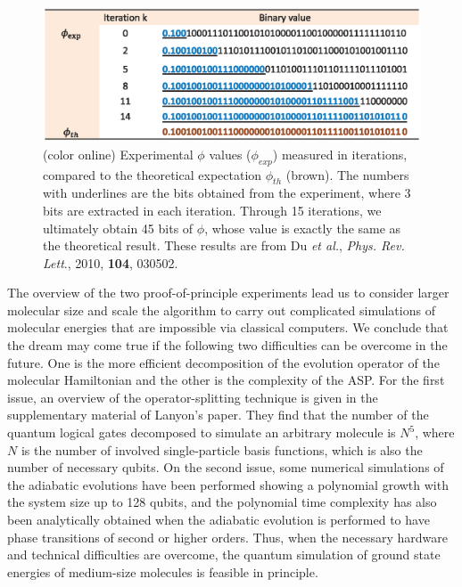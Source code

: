 \documentclass[8.5pt,twoside,twocolumn]{article}
\begin{document}
\begin{figure}[htb]
\begin{center}
\includegraphics[width= 0.95\columnwidth]{fig3.eps}
\end{center}
\caption{(color online) Experimental $\phi$ values ($\phi_{exp}$) measured in iterations, compared to the theoretical
expectation $\phi_{th}$ (brown). The numbers with underlines are the bits obtained from the experiment, where 3 bits are
extracted in each iteration. Through 15 iterations,
we ultimately obtain 45 bits of $\phi$, whose value is exactly the same as the theoretical result. These results are from Du \emph{et al.}, \emph{Phys. Rev. Lett}., 2010, \textbf{104}, 030502.\cite{NMR_static}}\label{fig3}
\end{figure}

The overview of the two proof-of-principle experiments
lead us to consider larger molecular size and scale the
algorithm to carry out complicated simulations of
molecular energies that are impossible via classical computers.
We conclude that the dream may come true if the following two difficulties
can be overcome in the future. One is the more
efficient decomposition of the evolution operator
of the molecular Hamiltonian and the other is
the complexity of the ASP.
For the first issue, an overview of the operator-splitting
technique is given in the supplementary material of Lanyon's paper.\cite{Optics_static}
They find that the number of the quantum logical gates
decomposed to simulate an arbitrary molecule is $N^5$,
where $N$ is the number of involved single-particle basis functions,
which is also the number of necessary qubits.
On the second issue, some numerical simulations of the adiabatic
evolutions have been performed showing a polynomial growth
with the system size up to 128 qubits,\cite{Adiabatic_6}
and the polynomial time complexity has also been analytically obtained
when the adiabatic evolution is performed to
have phase transitions of second or higher orders.\cite{Adiabatic_7}
Thus, when the necessary hardware and technical difficulties
are overcome, the quantum simulation of ground state energies
of medium-size molecules is feasible in principle.
\end{document}
